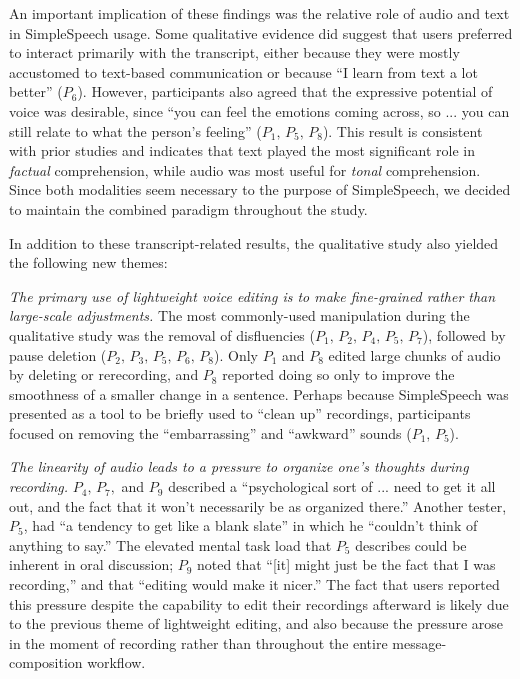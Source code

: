 An important implication of these findings was the relative role of audio and text in SimpleSpeech usage.
Some qualitative evidence did suggest that users preferred to interact primarily with the transcript, either because they were mostly accustomed to text-based communication or because ``I learn from text a lot better'' ($P_6$).
However, participants also agreed that the expressive potential of voice was desirable, since ``you can feel the emotions coming across, so ... you can still relate to what the person’s feeling'' ($P_1,\,P_5,\,P_8$).
This result is consistent with prior studies \cite{ice,oomen,tu} and indicates that text played the most significant role in \emph{factual} comprehension, while audio was most useful for \emph{tonal} comprehension.
Since both modalities seem necessary to the purpose of SimpleSpeech, we decided to maintain the combined paradigm throughout the study.

In addition to these transcript-related results, the qualitative study also yielded the following new themes:

\emph{The primary use of lightweight voice editing is to make fine-grained rather than large-scale adjustments.}
The most commonly-used manipulation during the qualitative study was the removal of disfluencies ($P_1,\,P_2,\,P_4,\,P_5,\,P_7$), followed by pause deletion ($P_2,\,P_3,\,P_5,\,P_6,\,P_8$). 
Only $P_1$ and $P_8$ edited large chunks of audio by deleting or rerecording, and $P_8$ reported doing so only to improve the smoothness of a smaller change in a sentence.
Perhaps because SimpleSpeech was presented as a tool to be briefly used to ``clean up'' recordings, participants focused on removing the ``embarrassing'' and ``awkward'' sounds ($P_1,\,P_5$). 

\emph{The linearity of audio leads to a pressure to organize one's thoughts during recording.}
$P_4,\,P_7,$ and $P_9$ described a ``psychological sort of ... need to get it all out, and the fact that it won't necessarily be as organized there.'' 
Another tester, $P_5$, had ``a tendency to get like a blank slate'' in which he ``couldn't think of anything to say.'' 
The elevated mental task load that $P_5$ describes could be inherent in oral discussion; $P_9$ noted that ``[it] might just be the fact that I was recording,'' and that ``editing would make it nicer.'' 
The fact that users reported this pressure despite the capability to edit their recordings afterward is likely due to the previous theme of lightweight editing, and also because the pressure arose in the moment of recording rather than throughout the entire message-composition workflow.

